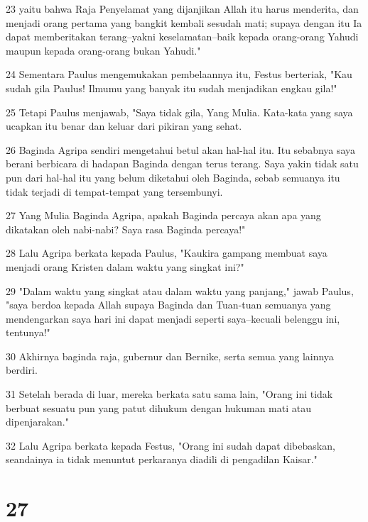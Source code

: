 \par 23 yaitu bahwa Raja Penyelamat yang dijanjikan Allah itu harus menderita, dan menjadi orang pertama yang bangkit kembali sesudah mati; supaya dengan itu Ia dapat memberitakan terang--yakni keselamatan--baik kepada orang-orang Yahudi maupun kepada orang-orang bukan Yahudi."
\par 24 Sementara Paulus mengemukakan pembelaannya itu, Festus berteriak, "Kau sudah gila Paulus! Ilmumu yang banyak itu sudah menjadikan engkau gila!"
\par 25 Tetapi Paulus menjawab, "Saya tidak gila, Yang Mulia. Kata-kata yang saya ucapkan itu benar dan keluar dari pikiran yang sehat.
\par 26 Baginda Agripa sendiri mengetahui betul akan hal-hal itu. Itu sebabnya saya berani berbicara di hadapan Baginda dengan terus terang. Saya yakin tidak satu pun dari hal-hal itu yang belum diketahui oleh Baginda, sebab semuanya itu tidak terjadi di tempat-tempat yang tersembunyi.
\par 27 Yang Mulia Baginda Agripa, apakah Baginda percaya akan apa yang dikatakan oleh nabi-nabi? Saya rasa Baginda percaya!"
\par 28 Lalu Agripa berkata kepada Paulus, "Kaukira gampang membuat saya menjadi orang Kristen dalam waktu yang singkat ini?"
\par 29 "Dalam waktu yang singkat atau dalam waktu yang panjang," jawab Paulus, "saya berdoa kepada Allah supaya Baginda dan Tuan-tuan semuanya yang mendengarkan saya hari ini dapat menjadi seperti saya--kecuali belenggu ini, tentunya!"
\par 30 Akhirnya baginda raja, gubernur dan Bernike, serta semua yang lainnya berdiri.
\par 31 Setelah berada di luar, mereka berkata satu sama lain, "Orang ini tidak berbuat sesuatu pun yang patut dihukum dengan hukuman mati atau dipenjarakan."
\par 32 Lalu Agripa berkata kepada Festus, "Orang ini sudah dapat dibebaskan, seandainya ia tidak menuntut perkaranya diadili di pengadilan Kaisar."

\chapter{27}

